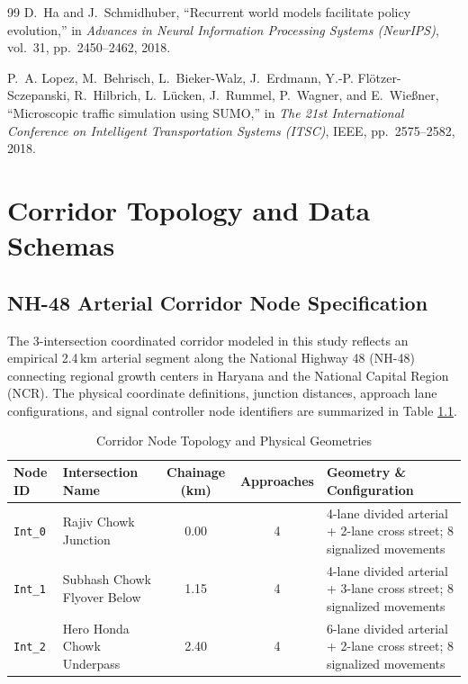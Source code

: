 \documentclass[12pt,a4paper,oneside]{report}
\begin{document}
\begin{small}
\begin{thebibliography}{99}
D.~Ha and J.~Schmidhuber, ``Recurrent world models facilitate policy evolution,'' in \emph{Advances in Neural Information Processing Systems (NeurIPS)}, vol.~31, pp.~2450--2462, 2018.

P.~A. Lopez, M.~Behrisch, L.~Bieker-Walz, J.~Erdmann, Y.-P. Fl{\"o}tzer-Sczepanski, R.~Hilbrich, L.~L{\"u}cken, J.~Rummel, P.~Wagner, and E.~Wie{\ss}ner, ``Microscopic traffic simulation using SUMO,'' in \emph{The 21st International Conference on Intelligent Transportation Systems (ITSC)}, IEEE, pp.~2575--2582, 2018.

\end{thebibliography}
\end{small}

\appendix
\chapter{Corridor Topology and Data Schemas}
\label{app:topology_schema}

\section{NH-48 Arterial Corridor Node Specification}
The 3-intersection coordinated corridor modeled in this study reflects an empirical 2.4\,km arterial segment along the National Highway 48 (NH-48) connecting regional growth centers in Haryana and the National Capital Region (NCR). The physical coordinate definitions, junction distances, approach lane configurations, and signal controller node identifiers are summarized in Table \ref{tab:corridor_spec_app}.

\begin{table}[htbp]
\centering
\small
\caption{Corridor Node Topology and Physical Geometries}
\label{tab:corridor_spec_app}
\begin{tabularx}{\textwidth}{|p{2.0cm}|p{3.2cm}|c|c|X|}
\hline
\textbf{Node ID} & \textbf{Intersection Name} & \textbf{Chainage (km)} & \textbf{Approaches} & \textbf{Geometry \& Configuration} \\ \hline
\texttt{Int\_0} & Rajiv Chowk Junction & 0.00 & 4 & 4-lane divided arterial + 2-lane cross street; 8 signalized movements \\ \hline
\texttt{Int\_1} & Subhash Chowk Flyover Below & 1.15 & 4 & 4-lane divided arterial + 3-lane cross street; 8 signalized movements \\ \hline
\texttt{Int\_2} & Hero Honda Chowk Underpass & 2.40 & 4 & 6-lane divided arterial + 2-lane cross street; 8 signalized movements \\ \hline
\end{tabularx}
\end{table}
\end{document}
